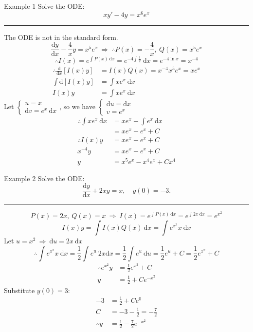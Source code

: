\documentclass[12pt,a4paper]{article}
\def\d{{\mathrm{d}}}
\def\dydx{\frac{\d y}{\d x}}
\def\dx{\d x}
\begin{document}
\begin{eg}{Example 1}
	Solve the ODE: $$xy'-4y=x^6e^x$$	
	\noindent\rule[0.25\baselineskip]{\textwidth}{1pt}
	The ODE is not in the standard form. 
	$$\frac{\d y}{\d x}-\frac{4}{x}y=x^5e^x\ \Rightarrow\ \therefore P(x)=-\frac{4}{x},\ Q(x)=x^5e^x$$
	$$\therefore I(x)=e^{\int P(x)\ \d x}=e^{-4\int\frac{1}{x}}\ \d x=e^{-4\ln{x}}=x^{-4}$$
	$$\begin{aligned}
		\therefore \frac{\d}{\d x}[I(x)y]&=I(x)Q(x)=x^{-4}x^5e^x=xe^x\\
		\int\d[I(x)y]&=\int xe^x\ \dx\\
		I(x)y&=\int xe^x\ \dx
	\end{aligned}$$
	Let $\begin{cases}u=x\\\d v=e^x \ \dx\end{cases}$, so we have $\begin{cases}\d u=\dx\\v=e^x\end{cases}$
	$$\begin{aligned}
		\therefore\int xe^x\ \dx&=xe^x-\int e^x\ \dx\\
		&=xe^x-e^x+C\\
		\therefore I(x)y&=xe^x-e^x+C\\
		x^{-4}y&=xe^x-e^x+C\\
		y&=x^5e^x-x^4e^x+Cx^4
	\end{aligned}$$
\end{eg}
\begin{eg}{Example 2}
	Solve the ODE: $$\dydx+2xy=x,\quad y(0)=-3.$$	
	\noindent\rule[0.25\baselineskip]{\textwidth}{1pt}
	$$P(x)=2x,\ Q(x)=x\ \Rightarrow\ I(x)=e^{\int P(x)\ \dx}=e^{\int 2x\ \dx}=e^{x^2}$$
	$$I(x)y=\int I(x)Q(x)\ \dx=\int e^{x^2}x\ \dx$$
	Let $u=x^2\ \Rightarrow\ \d u=2x\ \dx$
	$$\therefore\int e^{x^2}x\ \dx=\frac{1}{2}\int e^{u}\ 2x\dx=\frac{1}{2}\int e^u\ \d u=\frac{1}{2}e^u+C=\frac{1}{2}e^{x^2}+C$$
	$$\begin{aligned}
		\therefore e^{x^2}y&=\frac{1}{2}e^{x^2}+C\\
		y&=\frac{1}{2}+Ce^{-x^2}
	\end{aligned}$$
	Substitute $y(0)=3$: 
	$$\begin{aligned}
		-3&=\frac{1}{2}+Ce^0\\
		C&=-3-\frac{1}{2}=-\frac{7}{2}\\
		\therefore y&=\frac{1}{2}-\frac{7}{2}e^{-x^2}
	\end{aligned}$$
\end{eg}
\end{document}
